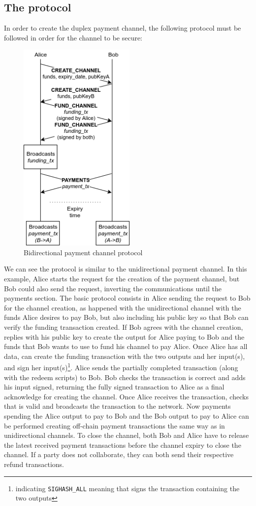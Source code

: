\documentclass[12pt,journal,compsoc]{IEEEtran}
\newcommand{\code}[1]{\texttt{#1}}
\begin{document}
\subsection{The protocol}
In order to create the duplex payment channel, the following protocol must be followed in order for the channel to be secure:
\begin{figure}[h]
    \begin{center}
        \includegraphics[height=10.5cm]{bidir-pc}
        \caption{Bidirectional payment channel protocol}
    \end{center}
\end{figure}
We can see the protocol is similar to the unidirectional payment channel. In this example, Alice starts the request for the creation of the payment channel, but Bob could also send the request, inverting the communications until the payments section. The basic protocol consists in Alice sending the request to Bob for the channel creation, as happened with the unidirectional channel with the funds Alice desires to pay Bob, but also including his public key so that Bob can verify the funding transaction created. If Bob agrees with the channel creation, replies with his public key to create the output for Alice paying to Bob and the funds that Bob wants to use to fund his channel to pay Alice. Once Alice has all data, can create the funding transaction with the two outputs and her input(s), and sign her input(s)\footnote{indicating \code{SIGHASH\_ALL} meaning that signs the transaction containing the two outputs}. Alice sends the partially completed transaction (along with the redeem scripts) to Bob. Bob checks the transaction is correct and adds his input signed, returning the fully signed transaction to Alice as a final acknowledge for creating the channel. Once Alice receives the transaction, checks that is valid and broadcasts the transaction to the network. Now payments spending the Alice output to pay to Bob and the Bob output to pay to Alice can be performed creating off-chain payment transactions the same way as in unidirectional channels. To close the channel, both Bob and Alice have to release the latest received payment transactions before the channel expiry to close the channel. If a party does not collaborate, they can both send their respective refund transactions.
\end{document}
